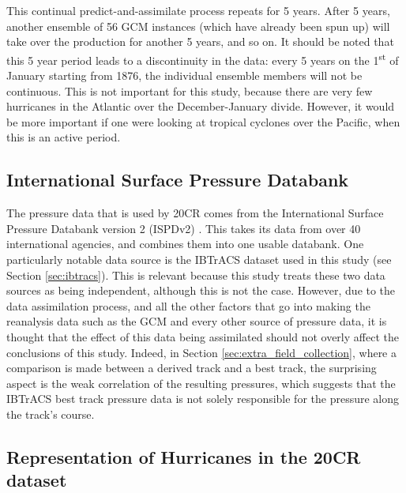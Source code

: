 \documentclass[pdftex,12pt,a4paper]{report}
\newcommand{\ts}{\textsuperscript}
\begin{document}
This continual predict-and-assimilate process repeats for 5 years. After 5 years, another ensemble
of 56 GCM instances (which have already been spun up) will take over the production for another 5
years, and so on. It should be noted that this 5 year period leads to a discontinuity in the data:
every 5 years on the 1\ts{st} of January starting from 1876, the individual ensemble members will
not be continuous. This is not important for this study, because there are very few hurricanes in
the Atlantic over the December-January divide. However, it would be more important if one were
looking at tropical cyclones over the Pacific, when this is an active period.

\subsection{International Surface Pressure Databank}
\label{sec:ispd}
The pressure data that is used by 20CR comes from the International Surface Pressure Databank
version 2 (ISPDv2) \parencite{yin2008international}. This takes its data from over 40 international
agencies, and combines them into one usable databank. One particularly notable data source is the
IBTrACS dataset used in this study (see Section \ref{sec:ibtracs}). This is relevant because this
study treats these two data sources as being independent, although this is not the case. However,
due to the data assimilation process, and all the other factors that go into making the reanalysis
data such as the GCM and every other source of pressure data, it is thought that the effect of this
data being assimilated should not overly affect the conclusions of this study. Indeed, in Section
\ref{sec:extra_field_collection}, where a comparison is made between a derived track and a best
track, the surprising aspect is the weak correlation of the resulting pressures, which suggests that
the IBTrACS best track pressure data is not solely responsible for the pressure along the track's
course.


\subsection{Representation of Hurricanes in the 20CR dataset}
\end{document}
